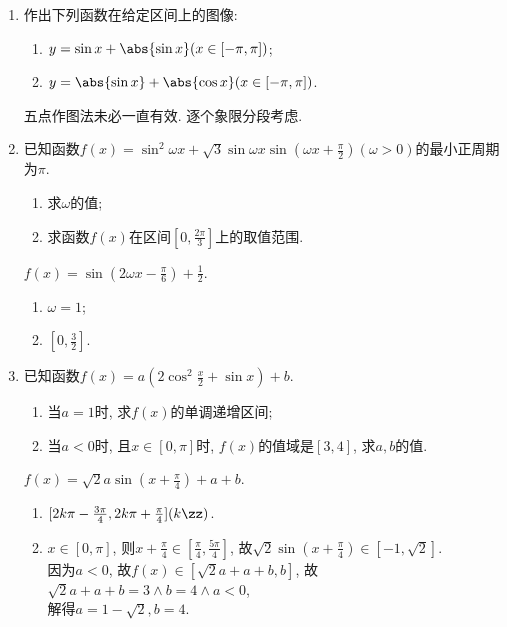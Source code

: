 \begin{enumerate}
\begin{jieda}
    $x\in[0,\frac{\pi}{2}]$, 则$2x+\frac{\pi}{6}\in[\frac{\pi}{6},\frac{7\pi}{6}]$, 即$f(x)\in[a,a+3]$. \\
    于是$-2<a<a+3<2$, 故$a\in(-2,-1)$. 
    \end{jieda}
    \item 作出下列函数在给定区间上的图像: 
    \begin{enumerate}[(1)]
    \item $y=\sin{x}+\abs{\sin{x}}(x\in[-\pi,\pi])$; 
    \item $y=\abs{\sin{x}}+\abs{\cos{x}}(x\in[-\pi,\pi])$.
    \end{enumerate}
    \begin{jieda}
    五点作图法未必一直有效. 逐个象限分段考虑.
    \end{jieda}
    \item 已知函数$f(x)=\sin^2\omega{x}+\sqrt{3}\sin\omega{x}\sin\left(\omega{x}+\frac{\pi}{2}\right)(\omega >0)$的最小正周期为$\pi$.
    \begin{enumerate}[(1)]
    \item 求$\omega$的值;
    \item 求函数$f(x)$在区间$\left[0,\frac{2\pi}{3}\right]$上的取值范围.
    \end{enumerate}
    \begin{jieda}
    $f(x)=\sin(2\omega{x}-\frac{\pi}{6})+\frac{1}{2}$. 
    \begin{enumerate}[(1)]
    \item $\omega=1$; 
    \item $[0,\frac{3}{2}]$. 
    \end{enumerate}
    \end{jieda}
    \item 已知函数$f(x)=a(2\cos^2\frac{x}{2}+\sin{x})+b$. 
    \begin{enumerate}[(1)]
    \item 当$a=1$时, 求$f(x)$的单调递增区间;
    \item 当$a<0$时, 且$x\in[0,\pi]$时, $f(x)$的值域是$[3,4]$, 求$a,b$的值.
    \end{enumerate}
    \begin{jieda}
    $f(x)=\sqrt{2}a\sin(x+\frac{\pi}{4})+a+b$. 
    \begin{enumerate}
    \item $[2k\pi-\frac{3\pi}{4},2k\pi+\frac{\pi}{4}](k\zz)$. 
    \item $x\in[0,\pi]$, 则$x+\frac{\pi}{4}\in[\frac{\pi}{4},\frac{5\pi}{4}]$, 故$\sqrt{2}\sin(x+\frac{\pi}{4})\in[-1,\sqrt{2}]$. \\
    因为$a<0$, 故$f(x)\in[\sqrt{2}a+a+b,b]$, 故$\sqrt{2}a+a+b=3\land b=4\land a<0$, \\
    解得$a=1-\sqrt{2},b=4$. 
    \end{enumerate}
    \end{jieda}
\end{enumerate}
